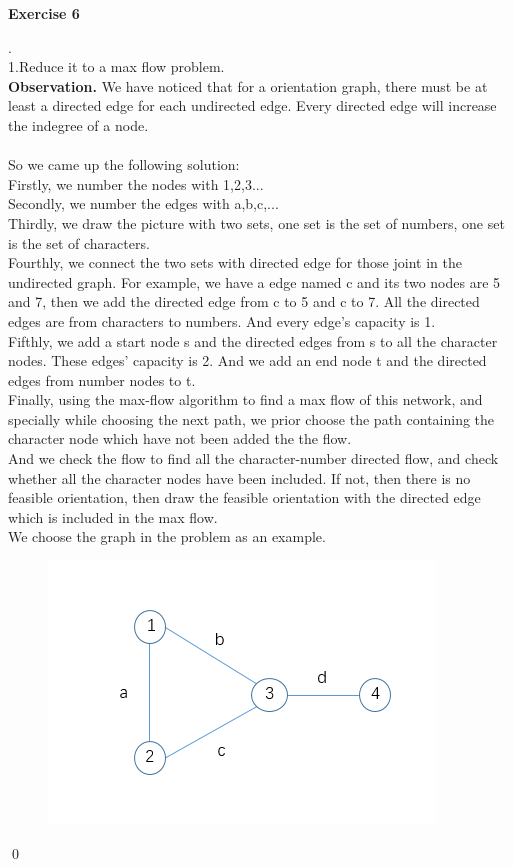 \documentclass[12pt, notitlepage]{article}
\newenvironment{sol}
  {\par\vspace{3mm}\noindent{\it Solution}.}{\qed}
\begin{document}
\textbf{Exercise 6}
\begin{sol}
    \\1.Reduce it to a max flow problem.\\
    \textbf{Observation.} We have noticed that for a orientation graph, there must be at least a directed edge for each undirected edge. Every directed edge will increase the indegree of a node.\\\\
    So we came up the following solution:\\
    Firstly, we number the nodes with 1,2,3...\\
    Secondly, we number the edges with a,b,c,...\\
    Thirdly, we draw the picture with two sets, one set is the set of numbers, one set is the set of characters.\\
    Fourthly, we connect the two sets with directed edge for those joint in the undirected graph. For example, we have a edge named c and its two nodes are 5 and 7, then we add the directed edge from c to 5 and c to 7. All the directed edges are from characters to numbers. And every edge's capacity is 1.\\
    Fifthly, we add a start node s and the directed edges from s to all the character nodes. These edges' capacity is 2. And we add an end node t and the directed edges from number nodes to t.\\
    Finally, using the max-flow algorithm to find a max flow of this network, and specially while choosing the next path, we prior choose the path containing the character node which have not been added the the flow.\\
    And we check the flow to find all the character-number directed flow, and check whether all the character nodes have been included. If not, then there is no feasible orientation, then draw the feasible orientation with the directed edge which is included in the max flow.\\
    We choose the graph in the problem as an example.\\
    \begin{figure}[H]
	\center
	\includegraphics[width=0.6\linewidth]{6-1.png}\vspace{-10pt}

\end{figure}
\end{sol}
\end{document}

